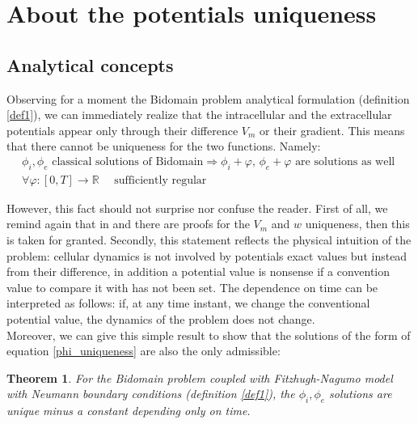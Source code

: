 \documentclass[a4paper,11pt]{article}
\newtheorem{theo}{Theorem}
\begin{document}
\newpage
\section{About the potentials uniqueness}\label{unique}
\subsection{Analytical concepts}
\noindent Observing for a moment the Bidomain problem analytical formulation (definition \ref{def1}), we can immediately realize that the intracellular and the extracellular potentials appear only through their difference $V_m$ or their gradient. This means that there cannot be uniqueness for the two functions. Namely: \vspace{2mm}
\begin{equation}\label{phi_uniqueness}
\begin{gathered}
\phi_i,\phi_e \text{ classical solutions of Bidomain} \Rightarrow \phi_i+\varphi,\,\phi_e+\varphi \text{ are solutions as well } \\
 \forall \varphi: [0,T] \rightarrow \mathbb{R} \quad \text{ sufficiently regular}
\end{gathered}
\end{equation}

\vspace{4mm}
\noindent However, this fact should not surprise nor confuse the reader. First of all, we remind again that in \cite{bourgault} and \cite{colli_franzone} there are proofs for the $V_m$ and $w$ uniqueness, then this is taken for granted. Secondly, this statement reflects the physical intuition of the problem: cellular dynamics is not involved by potentials exact values but instead from their difference, in addition a potential value is nonsense if a convention value to compare it with has not been set. The dependence on time can be interpreted as follows: if, at any time instant, we change the conventional potential value, the dynamics of the problem does not change. \\

\noindent Moreover, we can give this simple result to show that the solutions of the form of equation \ref{phi_uniqueness} are also the only admissible:\\
\begin{theo}
	For the Bidomain problem coupled with Fitzhugh-Nagumo model with Neumann boundary conditions (definition \ref{def1}), the $\phi_i,\phi_e$ solutions are unique minus a constant depending only on time. 
\end{theo}
\end{document}
